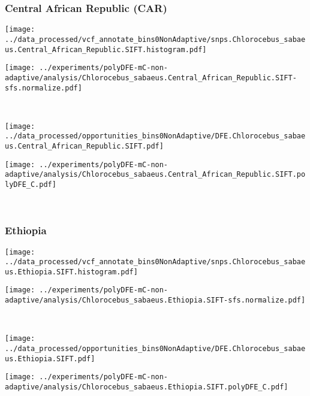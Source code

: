 \subsubsection{Central African Republic (CAR)}

\begin{minipage}{0.49\linewidth}
    \texttt{[image: ../data\_processed/vcf\_annotate\_bins0NonAdaptive/snps.Chlorocebus\_sabaeus.Central\_African\_Republic.SIFT.histogram.pdf]}
\end{minipage}
\begin{minipage}{0.49\linewidth}
    \texttt{[image: ../experiments/polyDFE-mC-non-adaptive/analysis/Chlorocebus\_sabaeus.Central\_African\_Republic.SIFT-sfs.normalize.pdf]}
\end{minipage}
\\
\begin{minipage}{0.49\linewidth}
    \texttt{[image: ../data\_processed/opportunities\_bins0NonAdaptive/DFE.Chlorocebus\_sabaeus.Central\_African\_Republic.SIFT.pdf]}
\end{minipage}
\begin{minipage}{0.49\linewidth}
    \texttt{[image: ../experiments/polyDFE-mC-non-adaptive/analysis/Chlorocebus\_sabaeus.Central\_African\_Republic.SIFT.polyDFE\_C.pdf]}
\end{minipage}
\\

\subsubsection{Ethiopia}

\begin{minipage}{0.49\linewidth}
    \texttt{[image: ../data\_processed/vcf\_annotate\_bins0NonAdaptive/snps.Chlorocebus\_sabaeus.Ethiopia.SIFT.histogram.pdf]}
\end{minipage}
\begin{minipage}{0.49\linewidth}
    \texttt{[image: ../experiments/polyDFE-mC-non-adaptive/analysis/Chlorocebus\_sabaeus.Ethiopia.SIFT-sfs.normalize.pdf]}
\end{minipage}
\\
\begin{minipage}{0.49\linewidth}
    \texttt{[image: ../data\_processed/opportunities\_bins0NonAdaptive/DFE.Chlorocebus\_sabaeus.Ethiopia.SIFT.pdf]}
\end{minipage}
\begin{minipage}{0.49\linewidth}
    \texttt{[image: ../experiments/polyDFE-mC-non-adaptive/analysis/Chlorocebus\_sabaeus.Ethiopia.SIFT.polyDFE\_C.pdf]}
\end{minipage}
\\

